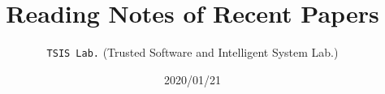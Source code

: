 \documentclass[]{article} %
\usepackage{titlesec}
\titleformat*{\section}{\normalfont\bfseries} %
\titleformat*{\subsection}{\normalfont\bfseries}
\usepackage{graphicx}
\usepackage{url}
\usepackage{listings}
\usepackage[a4paper,margin=2cm]{geometry}
\setcounter{tocdepth}{1}		%


\title{\textbf{Reading Notes of Recent Papers}}%
\author{\texttt{TSIS Lab.} (Trusted Software and Intelligent System Lab.)}
\date{2020/01/21}



